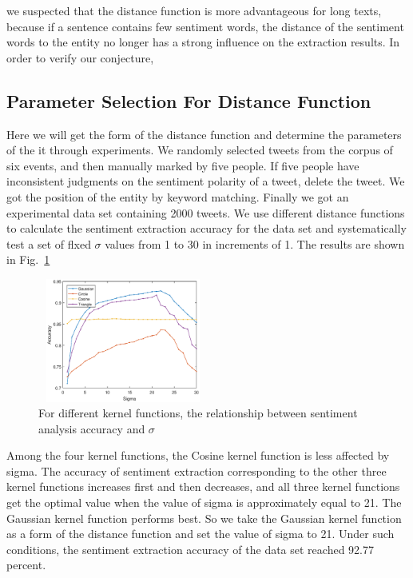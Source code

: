 \documentclass[runningheads]{llncs}
\begin{document}
 we suspected that the distance function is more advantageous for long texts, because if a sentence contains few sentiment words, the distance of the sentiment words to the entity no longer has a strong influence on the extraction results. In order to verify our conjecture, 

\subsection{Parameter Selection For Distance Function}
Here we will get the form of the distance function and determine the parameters of the it through experiments. We randomly selected tweets from the corpus of six events, and then manually marked by five people. If five people have inconsistent judgments on the sentiment polarity of a tweet, delete the tweet. We got the position of the entity by keyword matching. Finally we got an experimental data set containing 2000 tweets. We use different distance functions to calculate the sentiment extraction accuracy for the data set and systematically test a set of flxed $\sigma$ values from 1 to 30 in increments of 1. The results are shown in Fig.~\ref{fig:sigma}

\vspace{-0.5cm}
\begin{figure}
    \centering
    \includegraphics[width=0.5\textwidth,height=1.6in]{sigma.eps}
    \setlength{\abovecaptionskip}{-0.1cm}
    \caption{For different kernel functions, the relationship between sentiment analysis accuracy and $\sigma$}\label{fig:sigma}
\end{figure}

Among the four kernel functions, the Cosine kernel function is less affected by sigma. The accuracy of sentiment extraction corresponding to the other three kernel functions increases first and then decreases, and all three kernel functions get the optimal value when the value of sigma is approximately equal to 21. The Gaussian kernel function performs best. So we take the Gaussian kernel function as a form of the distance function and set the value of sigma to 21. Under such conditions, the sentiment extraction accuracy of the data set reached 92.77 percent.
\end{document}
